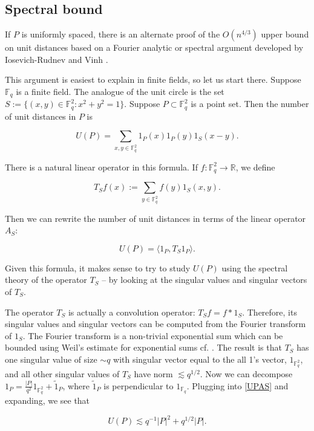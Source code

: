 \documentclass{amsart}
\newcommand{\FF}{\mathbb{F}}
\newcommand{\RR}{\mathbb{R}}
\begin{document}
\subsection{Spectral bound}

If $P$ is uniformly spaced,  there is an alternate proof of the $O(n^{4/3})$ upper bound on unit distances based on a Fourier analytic or spectral argument developed by Iosevich-Rudnev \cite{IR} and Vinh \cite{V}.  

This argument is easiest to explain in finite fields, so let us start there.  Suppose $\FF_q$ is a finite field.  The analogue of the unit circle is the set $S := \{ (x,y) \in \FF_q^2: x^2 + y^2 = 1 \}$.  Suppose $P \subset \FF_q^2$ is a point set.  Then the number of unit distances in $P$ is

\begin{equation} \label{UPenFq}
 U(P) = \sum_{x, y \in \FF_q^2} 1_{P}(x) 1_P(y) 1_S(x-y). 
 \end{equation}

There is a natural linear operator in this formula.  If $f: \FF_q^2 \rightarrow \RR$, we define

$$ T_S f(x) := \sum_{y \in \FF_q^2} f(y) 1_S(x,y).$$

Then we can rewrite the number of unit distances in terms of the linear operator $A_S$:

\begin{equation} \label{UPAS}
 U(P) = \langle 1_P, T_S 1_P \rangle. 
 \end{equation}

Given this formula, it makes sense to try to study $U(P)$ using the spectral theory of the operator $T_S$ -- by looking at the singular values and singular vectors of $T_S$.  

The operator $T_S$ is actually a convolution operator: $T_S f = f * 1_S$.  Therefore, its singular values and singular vectors can be computed from the Fourier transform of $1_S$.  The Fourier transform is a non-trivial exponential sum which can be bounded using Weil's estimate for exponential sums cf. \cite{IR}.  The result is that $T_S$ has one singular value of size $\sim q$ with singular vector equal to the all 1's vector, $1_{\FF_q^2}$, and all other singular values of $T_S$ have norm $\lesssim q^{1/2}$.  Now we can decompose $1_P = \frac{|P|}{q^2} 1_{\FF_q^2} + \tilde 1_P$, where $\tilde 1_P$ is perpendicular to $1_{\FF_q}$.  Plugging into \eqref{UPAS} and expanding, we see that

\begin{equation} \label{specbound}
U(P) \lesssim q^{-1}|P|^2 + q^{1/2} |P|.
\end{equation}
\end{document}

